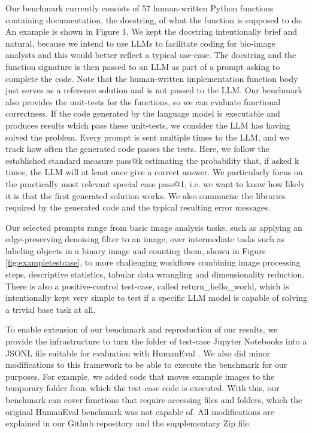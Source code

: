 \documentclass{ecai}
\begin{document}
Our benchmark currently consists of 57 human-written Python functions containing documentation, the docstring, of what the function is supposed to do. An example is shown in Figure 1. We kept the docstring intentionally brief and natural, because we intend to use LLMs to facilitate coding for bio-image analysts and this would better reflect a typical use-case. The docstring and the function signature is then passed to an LLM as part of a prompt asking to complete the code. Note that the human-written implementation function body just serves as a reference solution and is not passed to the LLM. Our benchmark also provides the unit-tests for the functions, so we can evaluate functional correctness. If the code generated by the language model is executable and produces results which pass these unit-tests, we consider the LLM has having solved the problem. Every prompt is sent multiple times to the LLM, and we track how often the generated code passes the tests. Here, we follow the established standard measure pass@k \citep{chen2021evaluating} estimating the probability that, if asked k times, the LLM will at least once give a correct answer. We particularly focus on the practically most relevant special case pass@1, i.e. we want to know how likely it is that the first generated solution works. We also summarize the libraries required by the generated code and the typical resulting error messages. 


Our selected prompts range from basic image analysis tasks, such as applying an edge-preserving denoising filter to an image, over intermediate tasks such as labeling objects in a binary image and counting them, shown in Figure \ref{fig:exampletestcase}, to more challenging workflows combining image processing steps, descriptive statistics, tabular data wrangling and dimensionality reduction. There is also a positive-control test-case, called return\_hello\_world, which is intentionally kept very simple to test if a specific LLM model is  capable of solving a trivial base task at all.

To enable extension of our benchmark and reproduction of our results, we provide the infrastructure to turn the folder of test-case Jupyter Notebooks into a JSONL file suitable for evaluation with HumanEval \citep{chen2021evaluating}. We also did minor modifications to this framework to be able to execute the benchmark for our purposes. For example, we added code that moves example images to the temporary folder from which the test-case code is executed. With this, our benchmark can cover functions that require accessing files and folders, which the original HumanEval benchmark was not capable of. All modifications are explained in our Github repository and the supplementary Zip file. 
\end{document}

